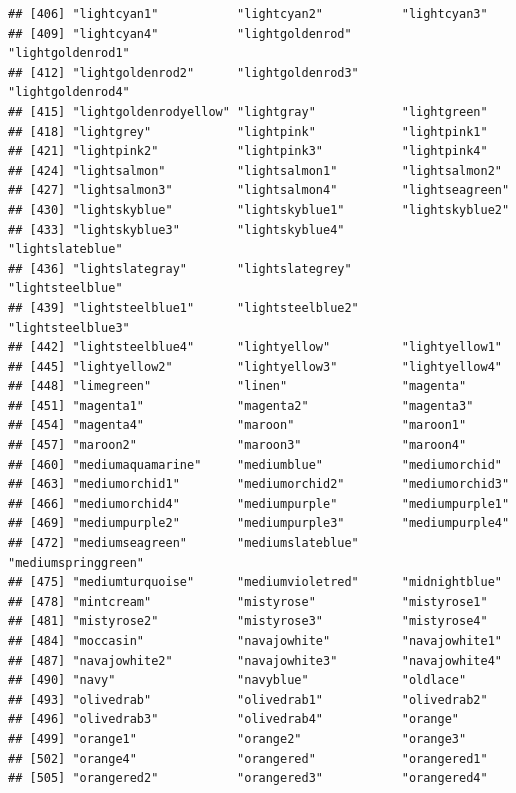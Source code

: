 \documentclass[
]{article}
\begin{document}
\begin{verbatim}
## [406] "lightcyan1"           "lightcyan2"           "lightcyan3"          
## [409] "lightcyan4"           "lightgoldenrod"       "lightgoldenrod1"     
## [412] "lightgoldenrod2"      "lightgoldenrod3"      "lightgoldenrod4"     
## [415] "lightgoldenrodyellow" "lightgray"            "lightgreen"          
## [418] "lightgrey"            "lightpink"            "lightpink1"          
## [421] "lightpink2"           "lightpink3"           "lightpink4"          
## [424] "lightsalmon"          "lightsalmon1"         "lightsalmon2"        
## [427] "lightsalmon3"         "lightsalmon4"         "lightseagreen"       
## [430] "lightskyblue"         "lightskyblue1"        "lightskyblue2"       
## [433] "lightskyblue3"        "lightskyblue4"        "lightslateblue"      
## [436] "lightslategray"       "lightslategrey"       "lightsteelblue"      
## [439] "lightsteelblue1"      "lightsteelblue2"      "lightsteelblue3"     
## [442] "lightsteelblue4"      "lightyellow"          "lightyellow1"        
## [445] "lightyellow2"         "lightyellow3"         "lightyellow4"        
## [448] "limegreen"            "linen"                "magenta"             
## [451] "magenta1"             "magenta2"             "magenta3"            
## [454] "magenta4"             "maroon"               "maroon1"             
## [457] "maroon2"              "maroon3"              "maroon4"             
## [460] "mediumaquamarine"     "mediumblue"           "mediumorchid"        
## [463] "mediumorchid1"        "mediumorchid2"        "mediumorchid3"       
## [466] "mediumorchid4"        "mediumpurple"         "mediumpurple1"       
## [469] "mediumpurple2"        "mediumpurple3"        "mediumpurple4"       
## [472] "mediumseagreen"       "mediumslateblue"      "mediumspringgreen"   
## [475] "mediumturquoise"      "mediumvioletred"      "midnightblue"        
## [478] "mintcream"            "mistyrose"            "mistyrose1"          
## [481] "mistyrose2"           "mistyrose3"           "mistyrose4"          
## [484] "moccasin"             "navajowhite"          "navajowhite1"        
## [487] "navajowhite2"         "navajowhite3"         "navajowhite4"        
## [490] "navy"                 "navyblue"             "oldlace"             
## [493] "olivedrab"            "olivedrab1"           "olivedrab2"          
## [496] "olivedrab3"           "olivedrab4"           "orange"              
## [499] "orange1"              "orange2"              "orange3"             
## [502] "orange4"              "orangered"            "orangered1"          
## [505] "orangered2"           "orangered3"           "orangered4"          

\end{verbatim}
\end{document}

